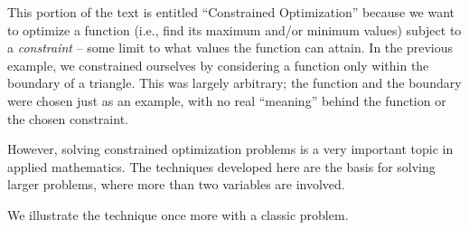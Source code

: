 This portion of the text is entitled ``Constrained Optimization'' because we want to optimize a function (i.e., find its maximum and/or minimum values) subject to a \textit{constraint} -- some limit to what values the function can attain. In the previous example, we constrained ourselves by considering a function only within the boundary of a triangle. This was largely arbitrary; the function and the boundary were chosen just as an example, with no real ``meaning'' behind the function or the chosen constraint.

However, solving constrained optimization problems is a very important topic in applied mathematics. The techniques developed here are the basis for solving larger problems, where more than two variables are involved.

We illustrate the technique once more with a classic problem.

